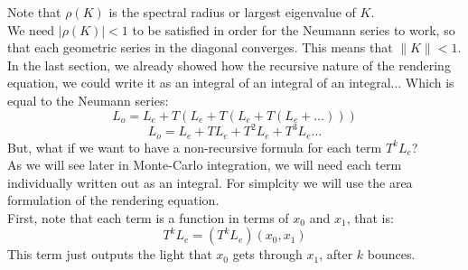 \documentclass[12pt]{article}
\begin{document}
Note that $\rho(K)$
is the spectral radius or largest eigenvalue
of $K$. \\

We need $|\rho(K)| < 1$ to be satisfied
in order for the Neumann series to work,
so that each geometric series in the diagonal
converges.
This means that $\|K\| < 1$. \\

In the last section, we already
showed how the recursive nature of the
rendering equation,
we could write it as an integral of an integral
of an integral...
Which is equal to the Neumann series:
\[ L_o = L_e + T( L_e + T( L_e + T (L_e + \dots))) \]
\[ L_o = L_e + TL_e + T^2L_e + T^3L_e \dots \]
But, what if we want to have a non-recursive
formula for each term $T^kL_e$? \\

As we will see later in Monte-Carlo integration,
we will need each term individually
written out as an integral. For simplcity
we will use the area formulation of the rendering
equation. \\

First, note that each term is a function
in terms of $x_0$ and $x_1$,
that is:
\[ T^kL_e = (T^kL_e)(x_0, x_1) \]
This term just outputs the light that $x_0$
gets through $x_1$, after $k$ bounces. \\
\end{document}
